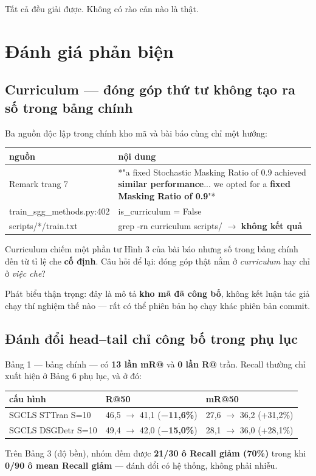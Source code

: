 \documentclass[11pt,a4paper]{article}
\newcommand{\code}[1]{{\ttfamily\small\color{codetext}#1}}
\begin{document}
Tất cả đều giải được. Không có rào cản nào là thật.

\section{Đánh giá phản biện}
\subsection{Curriculum --- đóng góp thứ tư không tạo ra số trong bảng chính}
Ba nguồn độc lập trong chính kho mã và bài báo cùng chỉ một hướng:

\begin{center}\small
\begin{tabular}{@{}ll@{}}
\toprule
\textbf{nguồn} & \textbf{nội dung}\\
\midrule
Remark trang 7 & *"a fixed Stochastic Masking Ratio of 0.9 achieved \textbf{similar performance}... we opted for a \textbf{fixed Masking Ratio of 0.9}"*\\
\code{train\_sgg\_methods.py:402} & \code{is\_curriculum = False}\\
\code{scripts/*/train.txt} & \code{grep -rn curriculum scripts/} $\rightarrow$ \textbf{không kết quả}\\
\bottomrule
\end{tabular}
\end{center}
Curriculum chiếm một phần tư Hình 3 của bài báo nhưng số trong bảng chính đến từ tỉ lệ che \textbf{cố định}. Câu hỏi để lại: đóng góp thật nằm ở \emph{curriculum} hay chỉ ở \emph{việc che}?

Phát biểu thận trọng: đây là mô tả \textbf{kho mã đã công bố}, không kết luận tác giả chạy thí nghiệm thế nào --- rất có thể phiên bản họ chạy khác phiên bản commit.

\subsection{Đánh đổi head--tail chỉ công bố trong phụ lục}
Bảng 1 --- bảng chính --- có \textbf{13 lần \code{mR@}} và \textbf{0 lần \code{R@}} trần. Recall thường chỉ xuất hiện ở Bảng 6 phụ lục, và ở đó:

\begin{center}\small
\begin{tabular}{@{}lll@{}}
\toprule
\textbf{cấu hình} & \textbf{R@50} & \textbf{mR@50}\\
\midrule
SGCLS STTran S=10 & 46,5 $\rightarrow$ 41,1 (\textbf{−11,6\%}) & 27,6 $\rightarrow$ 36,2 (+31,2\%)\\
SGCLS DSGDetr S=10 & 49,4 $\rightarrow$ 42,0 (\textbf{−15,0\%}) & 28,1 $\rightarrow$ 36,0 (+28,1\%)\\
\bottomrule
\end{tabular}
\end{center}
Trên Bảng 3 (độ bền), nhóm đếm được \textbf{21/30 ô Recall giảm (70\%)} trong khi \textbf{0/90 ô mean Recall giảm} --- đánh đổi có hệ thống, không phải nhiễu.
\end{document}
